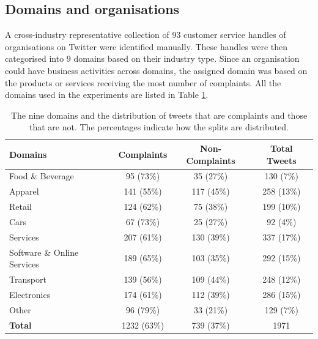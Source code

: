 \subsection{Domains and organisations}
A cross-industry representative collection of 93 customer service handles of organisations on Twitter were identified manually. These handles were then categorised into 9 domains based on their industry type. Since an organisation could have business activities across domains, the assigned domain was based on the products or services receiving the most number of complaints. All the domains used in the experiments are listed in Table \ref{tab: domains}.
\begin{table}[ht]
    \captionsetup{font=small}
    \centering
    \begin{tabularx}{\textwidth}{|X|c|c|c|}
        \hline
        \rowcolor[gray]{0.7}
        \textbf{Domains}            & \textbf{Complaints} & \textbf{Non-Complaints} & \textbf{Total Tweets} \\
        \hline
        Food \& Beverage            & 95 \small{(73\%)}   & 35 \small{(27\%)}       & 130 \small{(7\%)}     \\
        \rowcolor[gray]{0.9}
        Apparel                     & 141 \small{(55\%)}  & 117 \small{(45\%)}      & 258 \small{(13\%)}    \\
        Retail                      & 124 \small{(62\%)}  & 75 \small{(38\%)}       & 199 \small{(10\%)}    \\
        \rowcolor[gray]{0.9}
        Cars                        & 67 \small{(73\%)}   & 25 \small{(27\%)}       & 92 \small{(4\%)}      \\
        Services                    & 207 \small{(61\%)}  & 130 \small{(39\%)}      & 337 \small{(17\%)}    \\
        \rowcolor[gray]{0.9}
        Software \& Online Services & 189 \small{(65\%)}  & 103 \small{(35\%)}      & 292 \small{(15\%)}    \\
        Transport                   & 139 \small{(56\%)}  & 109 \small{(44\%)}      & 248 \small{(12\%)}    \\
        \rowcolor[gray]{0.9}
        Electronics                 & 174 \small{(61\%)}  & 112 \small{(39\%)}      & 286 \small{(15\%)}    \\
        Other                       & 96 \small{(79\%)}   & 33 \small{(21\%)}       & 129 \small{(7\%)}     \\
        \hline
        \rowcolor[gray]{0.9}
        \textbf{Total}              & 1232 \small{(63\%)} & 739 \small{(37\%)}      & 1971                  \\
        \hline
    \end{tabularx}
    \caption{The nine domains and the distribution of tweets that are complaints and those that are not. The percentages indicate how the splits are distributed.}
    \label{tab: domains}
\end{table}

